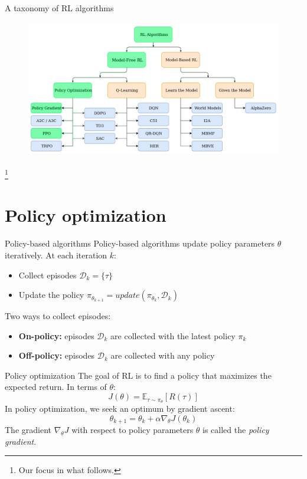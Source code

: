\documentclass[10pt, aspectratio=1610]{beamer}
\newcommand\blfootnote[1]{%
  \begingroup
  \renewcommand\thefootnote{}%
  \footnote{#1}%
  \addtocounter{footnote}{-1}%
  \endgroup
}
\begin{document}
\begin{frame}{A taxonomy of RL algorithms}
    \begin{figure}
        \includegraphics[height=6cm]{figures/taxonomy-focus.png}
    \end{figure}
    \blfootnote{
        Our focus in what follows.
    }
\end{frame}

\section{Policy optimization}

\begin{frame}{Policy-based algorithms}
    Policy-based algorithms update policy parameters $\theta$ iteratively. At each iteration $k$:
    \begin{itemize}
        \item Collect episodes $\mathcal{D}_k = \{ \tau \}$
        \item Update the policy $\pi_{\theta_{k+1}} = \mathit{update}(\pi_{\theta_k}, \mathcal{D}_k)$
    \end{itemize}
    Two ways to collect episodes:
    \begin{itemize}
        \item \textbf{On-policy:} episodes $\mathcal{D}_k$ are collected with the latest policy $\pi_k$
        \item \textbf{Off-policy:} episodes $\mathcal{D}_k$ are collected with any policy
    \end{itemize}
\end{frame}

\begin{frame}{Policy optimization}
    The goal of RL is to find a policy that maximizes the expected return. In terms of $\theta$:
    $$
    J(\theta) = \mathbb{E}_{\tau \sim \pi_\theta}[R(\tau)]
    $$
    In policy optimization, we seek an optimum by gradient ascent:
    $$
    \theta_{k+1} = \theta_k + \alpha \nabla_\theta J(\theta_k)
    $$
    The gradient $\nabla_\theta J$ with respect to policy parameters $\theta$ is called the \emph{policy gradient}.
\end{frame}
\end{document}
